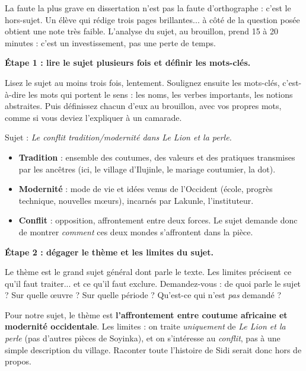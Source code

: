 \documentclass[11pt]{article}
\newcommand{\cle}[1]{{\popxbold\color{popdark}#1}}
\newcounter{popsec}
\newcounter{popsub}
\newcommand{\courssub}[1]{%
  \stepcounter{popsub}%
  \par\vspace{9pt}\noindent{\popxbold\fontsize{11.5}{13}\selectfont\color{popink}{\color{poporange}\thepopsec.\thepopsub}\hspace{6pt}#1}\par\nopagebreak\vspace{4pt}
}
\begin{document}
\courssub{Analyser le sujet : les quatre étapes}

\begin{attention}
La faute la plus grave en dissertation n'est pas la faute d'orthographe : c'est le \cle{hors-sujet}. Un élève qui rédige trois pages brillantes... à côté de la question posée obtient une note très faible. L'analyse du sujet, au brouillon, prend 15 à 20 minutes : c'est un investissement, pas une perte de temps.
\end{attention}

\textbf{Étape 1 : lire le sujet plusieurs fois et définir les mots-clés.}\par
Lisez le sujet au moins trois fois, lentement. Soulignez ensuite les \cle{mots-clés}, c'est-à-dire les mots qui portent le sens : les noms, les verbes importants, les notions abstraites. Puis définissez chacun d'eux au brouillon, avec vos propres mots, comme si vous deviez l'expliquer à un camarade.

\begin{exemplebox}
Sujet : \emph{Le conflit tradition/modernité dans Le Lion et la perle.}
\begin{itemize}
\item \textbf{Tradition} : ensemble des coutumes, des valeurs et des pratiques transmises par les ancêtres (ici, le village d'Ilujinle, le mariage coutumier, la dot).
\item \textbf{Modernité} : mode de vie et idées venus de l'Occident (école, progrès technique, nouvelles mœurs), incarnés par Lakunle, l'instituteur.
\item \textbf{Conflit} : opposition, affrontement entre deux forces. Le sujet demande donc de montrer \emph{comment} ces deux mondes s'affrontent dans la pièce.
\end{itemize}
\end{exemplebox}

\textbf{Étape 2 : dégager le thème et les limites du sujet.}\par
Le \cle{thème} est le grand sujet général dont parle le texte. Les \cle{limites} précisent ce qu'il faut traiter... et ce qu'il faut exclure. Demandez-vous : de quoi parle le sujet ? Sur quelle œuvre ? Sur quelle période ? Qu'est-ce qui n'est \emph{pas} demandé ?

\begin{exemplebox}
Pour notre sujet, le thème est \textbf{l'affrontement entre coutume africaine et modernité occidentale}. Les limites : on traite \emph{uniquement} de \emph{Le Lion et la perle} (pas d'autres pièces de Soyinka), et on s'intéresse au \emph{conflit}, pas à une simple description du village. Raconter toute l'histoire de Sidi serait donc hors de propos.
\end{exemplebox}
\end{document}
